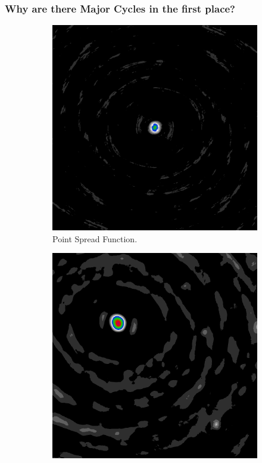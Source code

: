 \subsubsection{Why are there Major Cycles in the first place?}
\begin{figure}[h]
	\centering
	\begin{subfigure}[b]{0.3\linewidth}
		\includegraphics[width=\linewidth]{./chapters/01.intro/mk2/psf.png}
		\caption{Point Spread Function.}
		\label{results:points:tclean}
	\end{subfigure}
	\begin{subfigure}[b]{0.3\linewidth}
		\includegraphics[width=\linewidth]{./chapters/01.intro/mk2/dirty.png}

\end{subfigure}
\end{figure}
